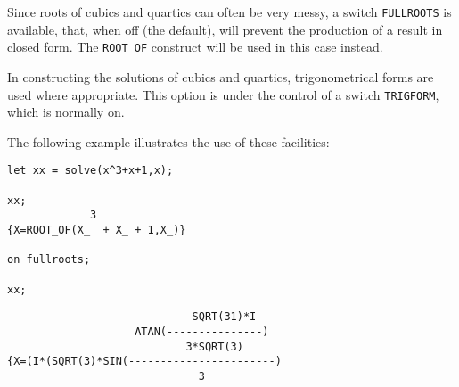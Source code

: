 Since roots of cubics and quartics can often be very messy, a switch
{\tt FULLROOTS} is available, that, when off (the
default), will prevent the production of a result in closed form.  The
{\tt ROOT\_OF} construct will be used in this case instead.

In constructing the solutions of cubics and quartics, trigonometrical
forms are used where appropriate.  This option is under the control of a
switch {\tt TRIGFORM}, which is normally on.

The following example illustrates the use of these facilities:
\begin{verbatim}
let xx = solve(x^3+x+1,x);

xx;
             3
{X=ROOT_OF(X_  + X_ + 1,X_)}

on fullroots;

xx;
\end{verbatim}
\begin{samepage}
\begin{verbatim}
                           - SQRT(31)*I
                    ATAN(---------------)
                            3*SQRT(3)
{X=(I*(SQRT(3)*SIN(-----------------------)
                              3
\end{verbatim}
\end{samepage}
